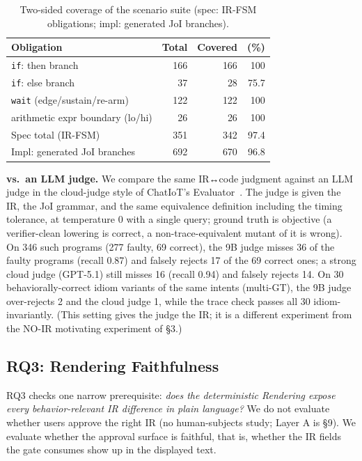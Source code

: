 \documentclass[sigconf,nonacm,anonymous,review]{acmart}
\begin{document}
\begin{table}[t]
\centering
\caption{Two-sided coverage of the scenario suite (spec: IR-FSM obligations; impl: generated JoI branches).}
\label{tab:coverage}
\small
\begin{tabular}{lrrr}
\toprule
Obligation & Total & Covered & (\%) \\
\midrule
\texttt{if}: then branch            & 166 & 166 & 100 \\
\texttt{if}: else branch            & 37  & 28  & 75.7 \\
\texttt{wait} (edge/sustain/re-arm) & 122 & 122 & 100 \\
arithmetic expr boundary (lo/hi)    & 26  & 26  & 100 \\
\midrule
Spec total (IR-FSM)                 & 351 & 342 & 97.4 \\
Impl: generated JoI branches        & 692 & 670 & 96.8 \\
\bottomrule
\end{tabular}
\end{table}

\textbf{vs.\ an LLM judge.} We compare the same IR↔code judgment against an LLM judge in the cloud-judge style of ChatIoT's Evaluator~\cite{chatiot}. The judge is given the IR, the JoI grammar, and the same equivalence definition including the timing tolerance, at temperature 0 with a single query; ground truth is objective (a verifier-clean lowering is correct, a non-trace-equivalent mutant of it is wrong). On 346 such programs (277 faulty, 69 correct), the 9B judge misses 36 of the faulty programs (recall 0.87) and falsely rejects 17 of the 69 correct ones; a strong cloud judge (GPT-5.1) still misses 16 (recall 0.94) and falsely rejects 14. On 30 behaviorally-correct idiom variants of the same intents (multi-GT), the 9B judge over-rejects 2 and the cloud judge 1, while the trace check passes all 30 idiom-invariantly. (This setting gives the judge the IR; it is a different experiment from the NO-IR motivating experiment of \S3.)

\subsection{RQ3: Rendering Faithfulness}

RQ3 checks one narrow prerequisite: \emph{does the deterministic Rendering expose every behavior-relevant IR difference in plain language?} We do not evaluate whether users approve the right IR (no human-subjects study; Layer A is \S9). We evaluate whether the approval surface is faithful, that is, whether the IR fields the gate consumes show up in the displayed text.
\end{document}
